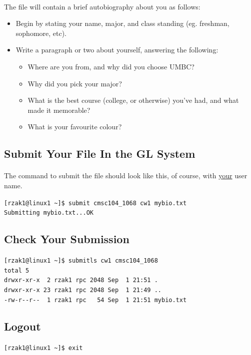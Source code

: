 \documentclass[letter,11pt]{article}
\begin{document}
\paragraph{}The file will contain a brief autobiography about you as follows:
\begin{itemize}
    \item Begin by stating your name, major, and class standing (eg. freshman, sophomore, etc).
    \item Write a paragraph or two about yourself, answering the following:
    \begin{itemize}
        \item Where are you from, and why did you choose UMBC?
        \item Why did you pick your major?
        \item What is the best course (college, or otherwise) you've had, and what made it memorable?
        \item What is your favourite colour?
    \end{itemize}
\end{itemize}

\subsection{Submit Your File In the GL System}
\paragraph{}The command to submit the file should look like this, of course, with \underline{your} user name.

\verb|[rzak1@linux1 ~]$ submit cmsc104_1068 cw1 mybio.txt| \\
\verb|Submitting mybio.txt...OK|

\subsection{Check Your Submission}
\verb|[rzak1@linux1 ~]$ submitls cw1 cmsc104_1068| \\
\verb|total 5| \\
\verb|drwxr-xr-x  2 rzak1 rpc 2048 Sep  1 21:51 .| \\
\verb|drwxr-xr-x 23 rzak1 rpc 2048 Sep  1 21:49 ..| \\
\verb|-rw-r--r--  1 rzak1 rpc   54 Sep  1 21:51 mybio.txt|

\subsection{Logout}
\verb|[rzak1@linux1 ~]$ exit| 
\end{document}
